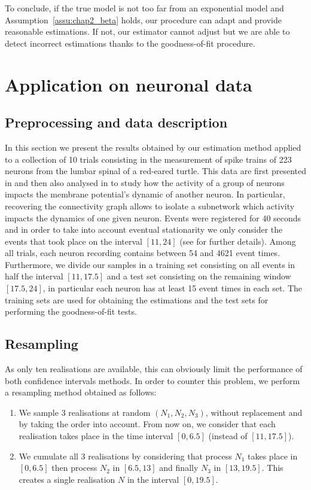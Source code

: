 To conclude, if the true model is not too far from an exponential model and Assumption~\ref{assu:chap2_beta} holds, our procedure can adapt and provide reasonable estimations. If not, our estimator cannot adjust but we are able to detect incorrect estimations thanks to the goodness-of-fit procedure.


\section{Application on neuronal data}\label{sec:chap2_neuron}

\subsection{Preprocessing and data description}

In this section we present the results obtained by our estimation method applied to a collection of 10 trials consisting in the measurement of spike trains of 223 neurons from the lumbar spinal of a red-eared turtle. This data are first presented in  \textcite{Petersen2016} and then also analysed in \textcite{Bonnet2022bis} to study how the activity of a group of neurons impacts the membrane potential's dynamic of another neuron. In particular, recovering the connectivity graph allows to isolate a subnetwork which activity impacts the dynamics of one given neuron.  Events were registered for 40 seconds and in order to take into account eventual stationarity we only consider the events that took place on the interval $[11, 24]$ (see \textcite{Bonnet2022bis} for further details).  Among all trials, each neuron recording contains between 54 and 4621 event times. Furthermore, we divide our samples in a training set consisting on all events in half the interval $[11, 17.5]$ and a test set consisting on the remaining window $[17.5, 24]$, in particular each neuron has at least 15 event times in each set. The training sets are used for obtaining the estimations and the test sets for performing the goodness-of-fit tests. 

\subsection{Resampling}

As only ten realisations are available, this can obviously limit the performance of both confidence intervals methods. In order to counter this problem, we perform a resampling method obtained as follows:
\begin{enumerate}
	\item We sample 3 realisations at random $(N_1, N_2, N_3)$, without replacement and by taking the order into account. From now on, we consider that each realisation takes place in the time interval $[0,6.5]$ (instead of $[11, 17.5]$).
	\item We cumulate all 3 realisations by considering that process $N_1$ takes place in $[0, 6.5]$ then process $N_2$ in $[6.5, 13]$ and finally $N_3$ in $[13, 19.5]$. This creates a single realisation $N$ in the interval $[0, 19.5]$. 
\end{enumerate}

